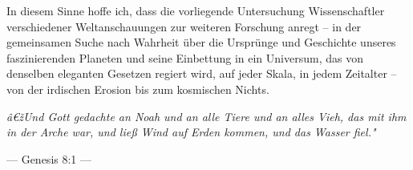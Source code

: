 ﻿\documentclass[12pt,a4paper]{report}
\begin{document}
In diesem Sinne hoffe ich, dass die vorliegende Untersuchung Wissenschaftler verschiedener Weltanschauungen zur weiteren Forschung anregt -- in der gemeinsamen Suche nach Wahrheit über die Ursprünge und Geschichte unseres faszinierenden Planeten und seine Einbettung in ein Universum, das von denselben eleganten Gesetzen regiert wird, auf jeder Skala, in jedem Zeitalter -- von der irdischen Erosion bis zum kosmischen Nichts.

\begin{center}
	\vspace{0.5cm}
	
	\textit{â€žUnd Gott gedachte an Noah und an alle Tiere und an alles Vieh, das mit ihm in der Arche war, und ließ Wind auf Erden kommen, und das Wasser fiel."}
	
	\vspace{0.2cm}
	
	--- Genesis 8:1 ---
\end{center}
\end{document}

